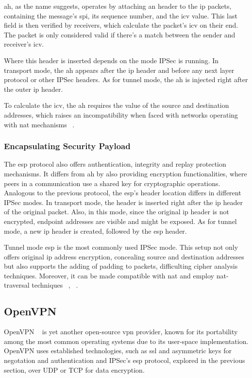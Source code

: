 \documentclass[11pt,twoside,a4paper]{report}
\begin{document}
\ac{ah}, as the name suggests, operates by attaching an header to the \ac{ip} packets, containing the message's \ac{spi}, its sequence number, and the \ac{icv} value. This last field is then verified by receivers, which calculate the packet's \ac{icv} on their end. The packet is only considered valid if there's a match between the sender and receiver's \ac{icv}.

Where this header is inserted depends on the mode IPSec is running. In transport mode, the \ac{ah} appears after the \ac{ip} header and before any next layer protocol or other IPSec headers. As for tunnel mode, the \ac{ah} is injected right after the outer \ac{ip} header.

To calculate the \ac{icv}, the \ac{ah} requires the value of the source and destination addresses, which raises an incompatibility when faced with networks operating with \ac{nat} mechanisms ~\cite{frankel2005guide}.

\subsubsection{Encapsulating Security Payload}

The \ac{esp} protocol also offers authentication, integrity and replay protection mechanisms. It differs from \ac{ah} by also providing encryption functionalities, where peers in a communication use a shared key for cryptographic operations. Analogous to the previous protocol, the \ac{esp}'s header location differs in different IPSec modes. In transport mode, the header is inserted right after the \ac{ip} header of the original packet. Also, in this mode, since the original \ac{ip} header is not encrypted, endpoint addresses are visible and might be exposed. As for tunnel mode, a new \ac{ip} header is created, followed by the \ac{esp} header.

Tunnel mode \ac{esp} is the most commonly used IPSec mode. This setup not only offers original \ac{ip} address encryption, concealing source and destination addresses but also supports the adding of padding to packets, difficulting cipher analysis techniques. Moreover, it can be made compatible with \ac{nat} and employ \ac{nat}-traversal techniques ~\cite{nam2022high}, ~\cite{singh2012nat}.

\subsection{OpenVPN}

OpenVPN ~\cite{ovpnwebsite} is yet another open-source \ac{vpn} provider, known for its portability among the most common operating systems due to its user-space implementation. OpenVPN uses established technologies, such as \ac{ssl} and asymmetric keys for negotation and authentication and IPSec's \ac{esp} protocol, explored in the previous section, over UDP or TCP for data encryption.
\end{document}
